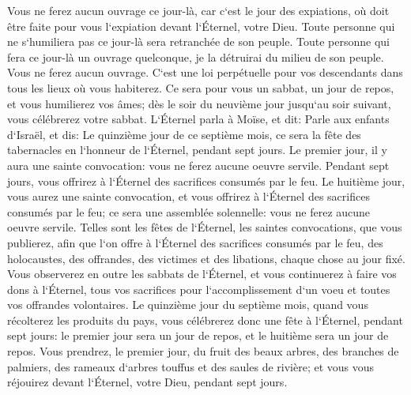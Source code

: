 \verse Vous ne ferez aucun ouvrage ce jour-là, car c`est le jour des expiations, où doit être faite pour vous l`expiation devant l`Éternel, votre Dieu. 
\verse Toute personne qui ne s`humiliera pas ce jour-là sera retranchée de son peuple. 
\verse Toute personne qui fera ce jour-là un ouvrage quelconque, je la détruirai du milieu de son peuple. 
\verse Vous ne ferez aucun ouvrage. C`est une loi perpétuelle pour vos descendants dans tous les lieux où vous habiterez. 
\verse Ce sera pour vous un sabbat, un jour de repos, et vous humilierez vos âmes; dès le soir du neuvième jour jusqu`au soir suivant, vous célébrerez votre sabbat. 
\verse L`Éternel parla à Moïse, et dit: 
\verse Parle aux enfants d`Israël, et dis: Le quinzième jour de ce septième mois, ce sera la fête des tabernacles en l`honneur de l`Éternel, pendant sept jours. 
\verse Le premier jour, il y aura une sainte convocation: vous ne ferez aucune oeuvre servile. 
\verse Pendant sept jours, vous offrirez à l`Éternel des sacrifices consumés par le feu. Le huitième jour, vous aurez une sainte convocation, et vous offrirez à l`Éternel des sacrifices consumés par le feu; ce sera une assemblée solennelle: vous ne ferez aucune oeuvre servile. 
\verse Telles sont les fêtes de l`Éternel, les saintes convocations, que vous publierez, afin que l`on offre à l`Éternel des sacrifices consumés par le feu, des holocaustes, des offrandes, des victimes et des libations, chaque chose au jour fixé. 
\verse Vous observerez en outre les sabbats de l`Éternel, et vous continuerez à faire vos dons à l`Éternel, tous vos sacrifices pour l`accomplissement d`un voeu et toutes vos offrandes volontaires. 
\verse Le quinzième jour du septième mois, quand vous récolterez les produits du pays, vous célébrerez donc une fête à l`Éternel, pendant sept jours: le premier jour sera un jour de repos, et le huitième sera un jour de repos. 
\verse Vous prendrez, le premier jour, du fruit des beaux arbres, des branches de palmiers, des rameaux d`arbres touffus et des saules de rivière; et vous vous réjouirez devant l`Éternel, votre Dieu, pendant sept jours. 
